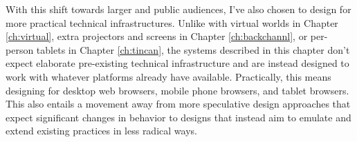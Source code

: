 With this shift towards larger and public audiences, I've also chosen to design for more practical technical infrastructures. Unlike with virtual worlds in Chapter \ref{ch:virtual}, extra projectors and screens in Chapter \ref{ch:backchannl}, or per-person tablets in Chapter \ref{ch:tincan}, the systems described in this chapter don't expect elaborate pre-existing technical infrastructure and are instead designed to work with whatever platforms already have available. Practically, this means designing for desktop web browsers, mobile phone browsers, and tablet browsers. This also entails a movement away from more speculative design approaches that expect significant changes in behavior to designs that instead aim to emulate and extend existing practices in less radical ways. 










% 
% 
% 
% 





